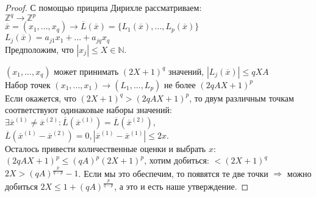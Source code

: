 \begin{proof}
С помощью приципа Дирихле рассматриваем:\\ $\mathbb{Z}^q \rightarrow \mathbb{Z}^p $\\
$\overline{x} = (x_1,...,x_q) \rightarrow \overline{L}(\overline{x}) = \{L_1(\overline{x}),...,L_p(\overline{x}) \}$\\
$L_j(\overline{x}) = a_{j1}x_1 + ... + a_{jq}x_q$\\
Предположим, что $|x_j| \leqslant X \in \mathbb{N}$.

$(x_1,...,x_q)$ может принимать $(2X + 1)^q $ значений, $ | L_j(\overline{x}) | \leqslant qXA $ \\
Набор точек $(x_1,...,x_1) \rightarrow (L_1,...,L_p)$ не более $(2qAX + 1)^p$\\
Если окажется, что $(2X + 1)^q > (2qAX + 1)^p$, то двум различным точкам соответствуют одинаковые наборы значений:\\
$\exists \overline{x}^{(1)} \not = \overline{x}^{(2)} : \overline{L}(\overline{x}^{(1)}) = \overline{L}(\overline{x}^{(2)})$,
$\overline{L}(\overline{x}^{(1)} - \overline{x}^{(2)}) = 0, | \overline{x}^{(1)} - \overline{x}^{(1)} | \leqslant 2x$.\\
Осталось привести количественные оценки и выбрать $x$:\\
$(2qAX + 1)^p \leqslant (qA)^p(2X + 1)^p$, хотим добиться: $ < (2X + 1)^q$\\
$2X > (qA)^{\frac{p}{q-p}} - 1$. Если мы это обеспечим, то появятся те две точки $\Rightarrow$ можно добиться $2X \leqslant 1 +  (qA)^{\frac{p}{q-p}}$, а это и есть наше утверждение.
\end{proof}

